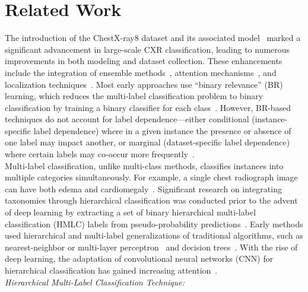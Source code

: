 \section{Related Work}\label{sec:taxonomy.relatedwork}
The introduction of the ChestX-ray8 dataset and its associated model~\cite{wang_ChestXRay8_2017} marked a significant advancement in large-scale CXR classification, leading to numerous improvements in both modeling and dataset collection. These enhancements include the integration of ensemble methods~\cite{islam_Abnormality_2017}, attention mechanisms~\cite{guan_Diagnose_2018,liu_SDFN_2019}, and localization techniques~\cite{cai_Iterative_2018,guendel_MultiTask_2019,li_Thoracic_2018,yan_Weakly_2018}. Most early approaches use ``binary relevance'' (BR) learning, which reduces the multi-label classification problem to binary classification by training a binary classifier for each class~\cite{zhang_Review_2014}. However, BR-based techniques do not account for label dependence---either conditional (instance-specific label dependence) where in a given instance the presence or absence of one label may impact another, or marginal (dataset-specific label dependence) where certain labels may co-occur more frequently~\cite{dembczynski_Label_2012}.
\\
Multi-label classification, unlike multi-class methods, classifies instances into multiple categories simultaneously. For example, a single chest radiograph image can have both edema and cardiomegaly~\cite{harvey_Standardised_2019,tsoumakas_MultiLabel_2007}. Significant research on integrating taxonomies through hierarchical classification was conducted prior to the advent of deep learning by extracting a set of binary hierarchical multi-label classification (HMLC) labels from pseudo-probability predictions~\cite{bi_BayesOptimal_2015}. Early methods used hierarchical and multi-label generalizations of traditional algorithms, such as nearest-neighbor or multi-layer perceptron~\cite{pourghassem_ContentBased_2008} and decision trees~\cite{dimitrovski_Hierarchical_2011}. With the rise of deep learning, the adaptation of convolutional neural networks (CNN) for hierarchical classification has gained increasing attention~\cite{guo_CNNRNN_2018,kowsari_HDLTex_2017,redmon_YOLO9000_2017,roy_TreeCNN_2020}.
\\
\textit{Hierarchical Multi-Label Classification Technique: }
